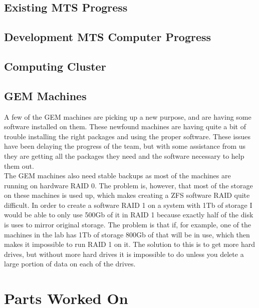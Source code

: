 \documentclass[12pt]{article}
\newcommand\tab[1][1cm]{\hspace*{#1}}
\begin{document}
\subsection{Existing MTS Progress}

\tab 

\subsection{Development MTS Computer Progress}

\tab 

\subsection{Computing Cluster}

\tab 

\subsection{GEM Machines}

\tab A few of the GEM machines are picking up a new purpose, and are having some software
installed on them. These newfound machines are having quite a bit of trouble installing the 
right packages and using the proper software. These issues have been delaying the progress of
the team, but with some assistance from us they are getting all the packages they need and the 
software necessary to help them out. \\

\tab The GEM machines also need stable backups as most of the machines are running on hardware
RAID 0. The problem is, however, that most of the storage on these machines is used up, which 
makes creating a ZFS software RAID quite difficult. In order to create a software RAID 1 on a system with 1Tb of storage I would be able to only use 500Gb of it in RAID 1 because exactly half
of the disk is uses to mirror original storage. The problem is that if, for example, one of the
machines in the lab has 1Tb of storage 800Gb of that will be in use, which then makes it
impossible to run RAID 1 on it. The solution to this is to get more hard drives, but without more
hard drives it is impossible to do unless you delete a large portion of data on each of the drives. 

\section{Parts Worked On}
\end{document}
